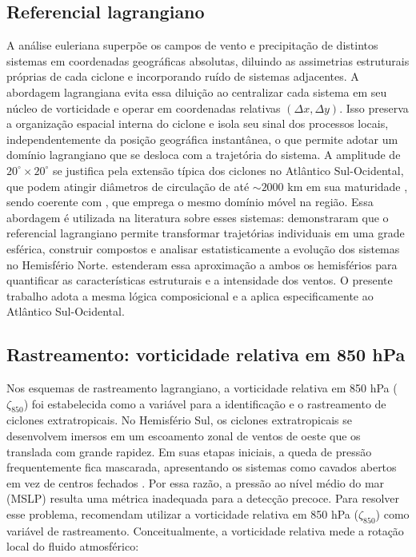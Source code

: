\subsection{Referencial lagrangiano}\label{subsec:tb_lagrangiano}
A análise euleriana superpõe os campos de vento e precipitação de distintos sistemas em coordenadas geográficas absolutas, diluindo as assimetrias estruturais próprias de cada ciclone e incorporando ruído de sistemas adjacentes.
A abordagem lagrangiana evita essa diluição ao centralizar cada sistema em seu núcleo de vorticidade e operar em coordenadas relativas $(\Delta x, \Delta y)$.
Isso preserva a organização espacial interna do ciclone e isola seu sinal dos processos locais, independentemente da posição geográfica instantânea, o que permite adotar um domínio lagrangiano que se desloca com a trajetória do sistema.
A amplitude de $20^{\circ} \times 20^{\circ}$ se justifica pela extensão típica dos ciclones no Atlântico Sul-Ocidental, que podem atingir diâmetros de circulação de até ${\sim}2000$ km em sua maturidade \citep{gramcianinov2020analysis}, sendo coerente com \citet{cardoso2022synoptic}, que emprega o mesmo domínio móvel na região.
Essa abordagem é utilizada na literatura sobre esses sistemas: \citet{laurila2021characteristics} demonstraram que o referencial lagrangiano permite transformar trajetórias individuais em uma grade esférica, construir compostos e analisar estatisticamente a evolução dos sistemas no Hemisfério Norte.
\citet{priestley2022improved} estenderam essa aproximação a ambos os hemisférios para quantificar as características estruturais e a intensidade dos ventos.
O presente trabalho adota a mesma lógica composicional e a aplica especificamente ao Atlântico Sul-Ocidental.

\subsection{Rastreamento: vorticidade relativa em 850 hPa}\label{subsec:tb_zeta}

Nos esquemas de rastreamento lagrangiano, a vorticidade relativa em 850 hPa ($\zeta_{850}$) foi estabelecida como a variável para a identificação e o rastreamento de ciclones extratropicais.
No Hemisfério Sul, os ciclones extratropicais se desenvolvem imersos em um escoamento zonal de ventos de oeste que os translada com grande rapidez.
Em suas etapas iniciais, a queda de pressão frequentemente fica mascarada, apresentando os sistemas como cavados abertos em vez de centros fechados \citep{sinclair1994objective}.
Por essa razão, a pressão ao nível médio do mar (MSLP) resulta uma métrica inadequada para a detecção precoce.
Para resolver esse problema, \citet{sinclair1997objective} recomendam utilizar a vorticidade relativa em 850 hPa ($\zeta_{850}$) como variável de rastreamento.
Conceitualmente, a vorticidade relativa mede a rotação local do fluido atmosférico:

